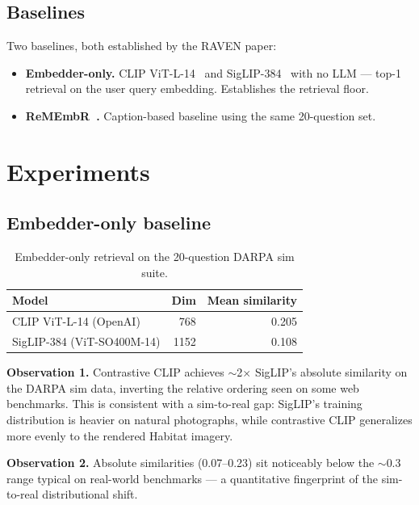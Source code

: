\documentclass[11pt]{article}
\begin{document}
\subsection{Baselines}
Two baselines, both established by the RAVEN paper:
\begin{itemize}[leftmargin=*,itemsep=2pt]
  \item \textbf{Embedder-only.} CLIP ViT-L-14~\cite{radford2021clip} and SigLIP-384~\cite{zhai2023siglip} with no LLM --- top-1 retrieval on the user query embedding. Establishes the retrieval floor.
  \item \textbf{ReMEmbR~\cite{anwar2024remembr}.} Caption-based baseline using the same 20-question set.
\end{itemize}

\section{Experiments}

\subsection{Embedder-only baseline}

\begin{table}[h]
\centering
\small
\caption{Embedder-only retrieval on the 20-question DARPA sim suite.}
\label{tab:embonly}
\begin{tabular}{lrr}
\toprule
\textbf{Model} & \textbf{Dim} & \textbf{Mean similarity} \\
\midrule
CLIP ViT-L-14 (OpenAI)            & 768  & 0.205 \\
SigLIP-384 (ViT-SO400M-14)        & 1152 & 0.108 \\
\bottomrule
\end{tabular}
\end{table}

\textbf{Observation 1.} Contrastive CLIP achieves $\sim$2$\times$ SigLIP's absolute similarity on the DARPA sim data, inverting the relative ordering seen on some web benchmarks. This is consistent with a sim-to-real gap: SigLIP's training distribution is heavier on natural photographs, while contrastive CLIP generalizes more evenly to the rendered Habitat imagery.

\textbf{Observation 2.} Absolute similarities (0.07--0.23) sit noticeably below the $\sim$0.3 range typical on real-world benchmarks --- a quantitative fingerprint of the sim-to-real distributional shift.
\end{document}
